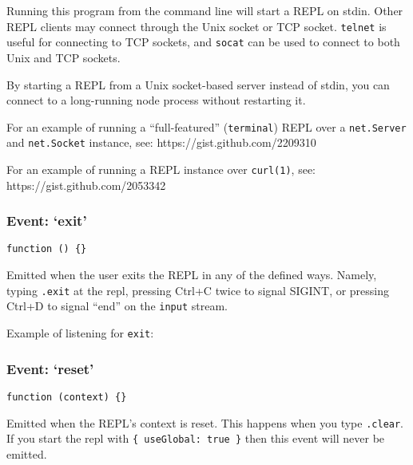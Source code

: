 Running this program from the command line will start a REPL on stdin.
Other REPL clients may connect through the Unix socket or TCP socket.
\texttt{telnet} is useful for connecting to TCP sockets, and
\texttt{socat} can be used to connect to both Unix and TCP sockets.

By starting a REPL from a Unix socket-based server instead of stdin, you
can connect to a long-running node process without restarting it.

For an example of running a ``full-featured'' (\texttt{terminal}) REPL
over a \texttt{net.Server} and \texttt{net.Socket} instance, see:
https://gist.github.com/2209310

For an example of running a REPL instance over \texttt{curl(1)}, see:
https://gist.github.com/2053342

\subsubsection{\texorpdfstring{Event:
`exit'}{Event: exit}}\label{event-exit}

\texttt{function\ ()\ \{\}}

Emitted when the user exits the REPL in any of the defined ways. Namely,
typing \texttt{.exit} at the repl, pressing Ctrl+C twice to signal
SIGINT, or pressing Ctrl+D to signal ``end'' on the \texttt{input}
stream.

Example of listening for \texttt{exit}:

\begin{Shaded}
\begin{Highlighting}[]
\NormalTok{(}\NormalTok{, } \NormalTok{() \{}
  \NormalTok{(}\NormalTok{);}
  \NormalTok{();}
\NormalTok{\});}
\end{Highlighting}
\end{Shaded}

\subsubsection{\texorpdfstring{Event:
`reset'}{Event: reset}}\label{event-reset}

\texttt{function\ (context)\ \{\}}

Emitted when the REPL's context is reset. This happens when you type
\texttt{.clear}. If you start the repl with
\texttt{\{\ useGlobal:\ true\ \}} then this event will never be emitted.

